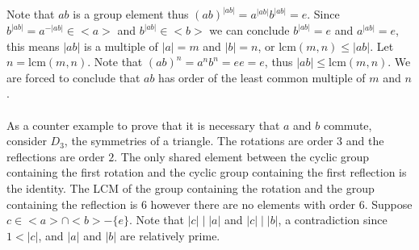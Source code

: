 \documentclass[12pt]{article}
\makeatletter
\theoremstyle{homework}
\newenvironment{exercise}[1]
{\def\@currentlabel{#1}\exercisecore}
{\endexercisecore}
\makeatother
\begin{document}
\begin{exercise}
{4.41}
Note that $ab$ is a group element thus $(ab)^{|ab|}=a^{|ab|}b^{|ab|}=e$.  Since $b^{|ab|}=a^{-|ab|}\in <a>$ and $b^{|ab|}\in <b>$ we can conclude $b^{|ab|}=e$ and $a^{|ab|}=e$, this means $|ab|$ is a multiple of $|a|=m$ and $|b|=n$, or $\text{lcm}(m,n)\leq |ab|$.  Let $n=\text{lcm}(m,n)$.  Note that $(ab)^{n}=a^{n}b^{n}=ee=e$, thus $|ab|\leq \text{lcm}(m,n)$.  We are forced to conclude that $ab$ has order of the least common multiple of $m$ and $n$.\\\\
As a counter example to prove that it is necessary that $a$ and $b$ commute, consider $D_3$, the symmetries of a triangle.  The rotations are order $3$ and the reflections are order $2$.  The only shared element between the cyclic group containing the first rotation and the cyclic group containing the first reflection is the identity.  The LCM of the group containing the rotation and the group containing the reflection is $6$ however there are no elements with order $6$.
\end{exercise}
\begin{exercise}
{4.64}
Suppose $c\in <a>\cap <b>-\{e\}$.  Note that $|c|\mid |a|$ and $|c|\mid |b|$, a contradiction since $1<|c|$, and $|a|$ and $|b|$ are relatively prime.
\end{exercise}
\end{document}
